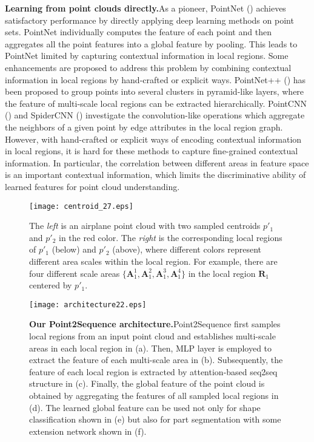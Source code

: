 \documentclass[letterpaper]{article}
\begin{document}
\noindent
\newline
\textbf{Learning from point clouds directly.}\quad  As a pioneer, PointNet (\citealt{qi2017pointnet}) achieves satisfactory performance by directly applying deep learning methods on point sets.
PointNet individually computes the feature of each point and then aggregates all the point features into a global feature by pooling.
This leads to PointNet limited by capturing contextual information in local regions.
Some enhancements are proposed to address this problem by combining contextual information in local regions by hand-crafted or explicit ways.
PointNet++ (\citealt{qi2017pointnet++}) has been proposed to group points into several clusters in pyramid-like layers, where the feature of multi-scale local regions can be extracted hierarchically.
PointCNN (\citealt{li2018pointcnn}) and SpiderCNN (\citealt{xu2018spidercnn}) investigate the convolution-like operations which aggregate the neighbors of a given point by edge attributes in the local region graph.
However, with hand-crafted or explicit ways of encoding contextual information in local regions, it is hard for these methods to capture fine-grained contextual information.
In particular, the correlation between different areas in feature space is an important contextual information, which limits the discriminative ability of learned features for point cloud understanding.
\begin{figure}[tp]
\centering 
\texttt{[image: centroid\_27.eps]}
\caption{The \textit{left} is an airplane point cloud with two sampled centroids $p'_1$ and $p'_2$ in the red color. The \textit{right} is the corresponding local regions of $p'_1$ (below) and $p'_2$ (above), where different colors represent different area scales within the local region. For example, there are four different scale areas $\lbrace \bm{A}_1^1, \bm{A}_1^2, \bm{A}_1^3, \bm{A}_1^4 \rbrace$ in the local region $\bm{R}_1$ centered by $p'_1$.}
\label{fig:multi-scalas}  \end{figure}
\begin{figure*}[tp]
\centering
\texttt{[image: architecture22.eps]}
\caption{\textbf{Our Point2Sequence architecture.}\quad Point2Sequence first samples local regions from an input point cloud and establishes multi-scale areas in each local region in (a). Then, MLP layer is employed to extract the feature of each multi-scale area in (b). Subsequently, the feature of each local region is extracted by attention-based seq2seq structure in (c). Finally, the global feature of the point cloud is obtained by aggregating the features of all sampled local regions in (d). The learned global feature can be used not only for shape classification shown in (e) but also for part segmentation with some extension network shown in (f).
}
\label{fig:network_arichitecture} 
\end{figure*}
\end{document}
